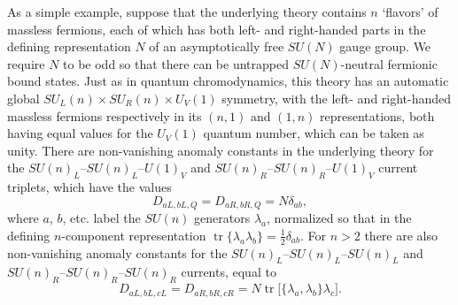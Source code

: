 As a simple example, suppose that the underlying theory contains $n$
`flavors' of massless fermions, each of which has both left- and
right-handed parts in the defining representation $N$ of an asymptotically
free $SU(N)$ gauge group. We require $N$ to be odd so that there can be
untrapped $SU(N)$-neutral fermionic bound states. Just as in quantum
chromodynamics, this theory has an automatic global
$SU_L(n)\times SU_R(n)\times U_V(1)$ symmetry, with the left- and
right-handed massless fermions respectively in its $(n,1)$ and $(1,n)$
representations, both having equal values for the $U_V(1)$ quantum number,
which can be taken as unity. There are non-vanishing anomaly constants in
the underlying theory for the
$SU(n)_L$--$SU(n)_L$--$U(1)_V$ and
$SU(n)_R$--$SU(n)_R$--$U(1)_V$ current triplets, which have the values
\[
 D_{aL,bL,Q}=D_{aR,bR,Q}=N\delta_{ab},
\]
where $a$, $b$, etc. label the $SU(n)$ generators $\lambda_a$, normalized
so that in the defining $n$-component representation
$\operatorname{tr}\{\lambda_a\lambda_b\}=\frac12\delta_{ab}$. For $n>2$
there are also non-vanishing anomaly constants for the
$SU(n)_L$--$SU(n)_L$--$SU(n)_L$ and
$SU(n)_R$--$SU(n)_R$--$SU(n)_R$ currents, equal to
\[
 D_{aL,bL,cL}=D_{aR,bR,cR}
 =N\operatorname{tr}\bigl[\{\lambda_a,\lambda_b\}\lambda_c\bigr].
\]

